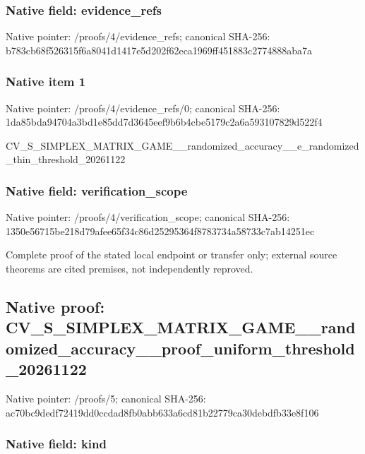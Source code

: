 \documentclass[10pt,a4paper]{article}
\begin{document}
\subsubsection{Native field: evidence\_refs}


Native pointer: /proofs/4/evidence\_refs; canonical SHA-256: b783cb68f526315f6a8041d1\allowbreak{}417e5d202f62eca1969ff451\allowbreak{}883c2774888aba7a



\subsubsection{Native item 1}


Native pointer: /proofs/4/evidence\_refs/0; canonical SHA-256: 1da85bda94704a3bd1e85dd7\allowbreak{}d3645eef9b6b4cbe5179c2a6\allowbreak{}a593107829d522f4


CV\_S\_SIMPLEX\_MATRIX\_GAME\allowbreak{}\_\_randomized\_accuracy\_\_e\allowbreak{}\_randomized\_thin\_thresho\allowbreak{}ld\_20261122


\subsubsection{Native field: verification\_scope}


Native pointer: /proofs/4/verification\_scope; canonical SHA-256: 1350e56715be218d79afee65\allowbreak{}f34c86d25295364f8783734a\allowbreak{}58733c7ab14251ec


Complete proof of the stated local endpoint or transfer only; external source theorems are cited premises, not independently reproved.


\subsection{Native proof: CV\_S\_SIMPLEX\_MATRIX\_GAME\allowbreak{}\_\_randomized\_accuracy\_\_p\allowbreak{}roof\_uniform\_threshold\_2\allowbreak{}0261122}


Native pointer: /proofs/5; canonical SHA-256: ac70bc9dedf72419dd0ccdad\allowbreak{}8fb0abb633a6cd81b22779ca\allowbreak{}30debdfb33e8f106



\subsubsection{Native field: kind}
\end{document}
